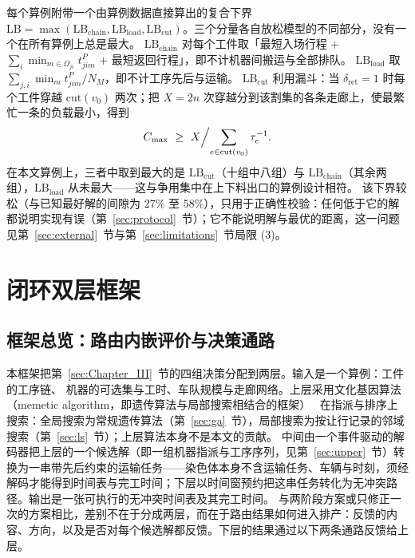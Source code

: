 \documentclass[manuscript,screen,review]{acmart}
\newcommand{\LBGapLo}{27\%}
\newcommand{\LBGapHi}{58\%}
\begin{document}
每个算例附带一个由算例数据直接算出的复合下界
$\mathrm{LB}=\max(\mathrm{LB}_{\text{chain}},\mathrm{LB}_{\text{load}},
\mathrm{LB}_{\text{cut}})$。三个分量各自放松模型的不同部分，没有一个在所有算例上总是最大。
$\mathrm{LB}_{\text{chain}}$ 对每个工件取「最短入场行程 $+$
$\sum_i \min_{m\in\Omega_{ji}}t^P_{jim}$ $+$ 最短返回行程」，即不计机器间搬运与全部排队。
$\mathrm{LB}_{\text{load}}$ 取 $\sum_{j,i}\min_m t^P_{jim}/N_M$，即不计工序先后与运输。
$\mathrm{LB}_{\text{cut}}$ 利用漏斗：当 $\delta_{\mathrm{ret}}=1$ 时每个工件穿越
$\mathrm{cut}(v_0)$ 两次；把 $X=2n$ 次穿越分到该割集的各条走廊上，使最繁忙一条的负载最小，得到
\begin{equation}
\label{eq:lbcut}
C_{\max}\ \ge\ X\Bigl/\sum_{e\in \mathrm{cut}(v_0)}\tau_e^{-1}.
\end{equation}
在本文算例上，三者中取到最大的是 $\mathrm{LB}_{\text{cut}}$（十组中八组）与
$\mathrm{LB}_{\text{chain}}$（其余两组），$\mathrm{LB}_{\text{load}}$ 从未最大——这与争用集中在上下料出口的算例设计相符。
该下界较松（与已知最好解的间隙为 \LBGapLo{} 至 \LBGapHi{}），只用于正确性校验：任何低于它的解都说明实现有误（第~\ref{sec:protocol}~节）；它不能说明解与最优的距离，这一问题见第~\ref{sec:external}~节与第~\ref{sec:limitations}~节局限 (3)。

\section{闭环双层框架}
\label{sec:Chapter_IV}
\subsection{框架总览：路由内嵌评价与决策通路}
\label{sec:overview}

本框架把第~\ref{sec:Chapter_III}~节的四组决策分配到两层。输入是一个算例：工件的工序链、
机器的可选集与工时、车队规模与走廊网络。上层采用文化基因算法（memetic algorithm，即遗传算法与局部搜索相结合的框架）~\cite{zhang2024memetic} 在指派与排序上搜索：全局搜索为常规遗传算法（第~\ref{sec:ga}~节），局部搜索为按让行记录的邻域搜索（第~\ref{sec:ls}~节）；上层算法本身不是本文的贡献。
中间由一个事件驱动的解码器把上层的一个候选解（即一组机器指派与工序序列，见第~\ref{sec:upper}~节）转换为一串带先后约束的运输任务——染色体本身不含运输任务、车辆与时刻，须经解码才能得到时间表与完工时间；下层以时间窗预约把这串任务转化为无冲突路径。输出是一张可执行的无冲突时间表及其完工时间。
与两阶段方案或只修正一次的方案相比，差别不在于分成两层，而在于路由结果如何进入排产：反馈的内容、方向，以及是否对每个候选解都反馈。下层的结果通过以下两条通路反馈给上层。
\end{document}
